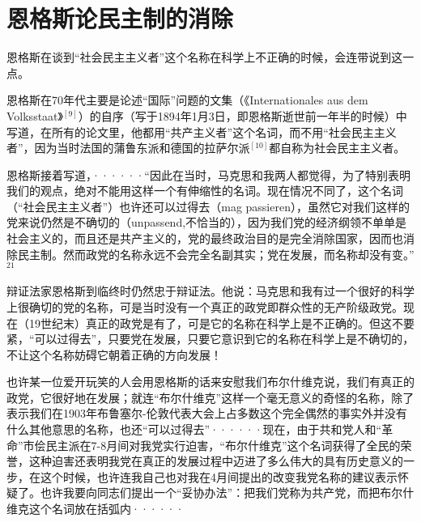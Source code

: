 \chapter{恩格斯论民主制的消除} %

恩格斯在谈到“社会民主主义者”这个名称在{\kaishu 科学上}不正确的时候，会连带说到这一点。

恩格斯在70年代主要是论述“国际”问题的文集（《Internationales aus dem Volksstaat》$^{[9]}$）的自序（写于1894年1月3日，即恩格斯逝世前一年半的时候）中写道，在所有的论文里，他都用“共产主义者”这个名词，而不用“社会民主主义者”，因为当时法国的蒲鲁东派和德国的拉萨尔派$^{[10]}$都自称为社会民主主义者。

\pskip
\small
\leftskip=10mm

恩格斯接着写道，······“因此在当时，马克思和我两人都觉得，为了特别表明我们的观点，绝对不能用这样一个有伸缩性的名词。现在情况不同了，这个名词（“社会民主主义者”）也许还可以过得去（mag passieren），虽然它对我们这样的党来说仍然是不确切的（unpassend,不恰当的），因为我们党的经济纲领不单单是社会主义的，而且还是共产主义的，党的最终政治目的是完全消除国家，因而也消除民主制。然而政党的名称永远不会完全名副其实；党在发展，而名称却没有变。”$^{21}$

\leftskip=0mm
\normalsize
\pskip

辩证法家恩格斯到临终时仍然忠于辩证法。他说：马克思和我有过一个很好的科学上很确切的党的名称，可是当时没有一个真正的政党即群众性的无产阶级政党。现在（19世纪末）真正的政党是有了，可是它的名称在科学上是不正确的。但这不要紧，“可以过得去”，只要党{\kaishu 在发展}，只要它意识到它的名称在科学上是不确切的，不让这个名称妨碍它朝着正确的方向发展！

也许某一位爱开玩笑的人会用恩格斯的话来安慰我们布尔什维克说，我们有真正的政党，它很好地在发展；就连“布尔什维克”这样一个毫无意义的奇怪的名称，除了表示我们在1903年布鲁塞尔-伦敦代表大会上占多数这个完全偶然的事实外并没有什么其他意思的名称，也还“可以过得去”······\quad 现在，由于共和党人和“革命”市侩民主派在7-8月间对我党实行迫害，“布尔什维克”这个名词获得了全民的荣誉，这种迫害还表明我党在{\kaishu 真正的}发展过程中迈进了多么伟大的具有历史意义的一步，在这个时候，也许连我自己也对我在4月间提出的改变我党名称的建议表示怀疑了。也许我要向同志们提出一个“妥协办法”：把我们党称为共产党，而把布尔什维克这个名词放在括弧内······

